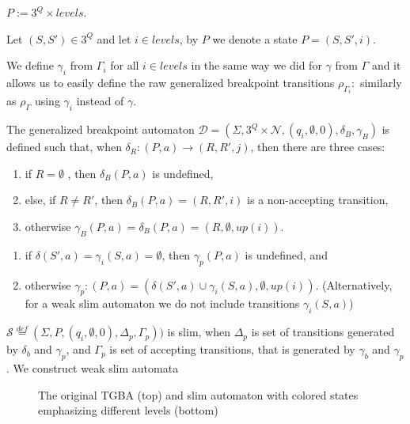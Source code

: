 \documentclass[
	digital
nolof, nolot
]{fithesis3}
\newcommand{\cD}{\mathcal{D}}
\newcommand{\cN}{\mathcal{N}}
\newcommand{\cS}{\mathcal{S}}
\newcommand{\eqdef}{\overset{def}{=}}
\begin{document}
			$P := 3^Q \times levels$.
			
			Let $(S,S')\in 3^Q$ and let $i \in levels$, by $P$ we denote a state $P=(S,S',i)$.
			
			We define $\gamma_i$ from $\Gamma_i$ for all $i \in levels$ in the same way we did for $\gamma$ from $\Gamma$ and it allows us to easily define the raw generalized breakpoint transitions
			$\rho_{\Gamma_{i}}\colon$ similarly as $\rho_\Gamma$ using $\gamma_i$ instead of $\gamma$.
			
			
			
			The generalized breakpoint automaton $\cD=(\Sigma, 3^Q\times\cN, ({q_i},\emptyset, 0),\delta_B,\gamma_B)$ is defined such that, when $\delta_R\colon(P, a) \rightarrow (R, R', j)$, then there are three cases:
			
			
			
			\begin{enumerate}
				\item if $R=\emptyset$ , then $\delta_B(P,a)$ is undefined,
				\item else, if $R \neq R'$, then $\delta_B(P,a) = (R,R',i)$ is a non-accepting transition,
				\item otherwise $\gamma_B(P, a) = \delta_B(P,a) = (R, \emptyset, up(i))$.
			\end{enumerate}
		
		
			\begin{enumerate}
				\item if $\delta(S',a)=\gamma_{i}(S, a)=\emptyset$, then $ \gamma_{p}(P,a)$ is undefined, and
				\item otherwise $\gamma_p \colon (P,a) = (\delta(S',a)\cup \gamma_{i}(S, a), \emptyset, up(i))$. (Alternatively, for a weak slim automaton we do not include transitions $\gamma_{i}(S, a)$)
			\end{enumerate}
			$\cS\eqdef(\Sigma, P, (q_i,\emptyset,0), \Delta_p,\Gamma_p))$ is slim, when $\Delta_p$ is set of transitions generated by $\delta_b$ and $\gamma_p$, and $\Gamma_p$ is set of accepting transitions, that is generated by $\gamma_b$ and $\gamma_p$. We construct weak slim automata 
			
						
			\begin{figure}[ht]
				\begin{center}
					
					
				\end{center}
				\caption{The original TGBA (top) and slim automaton with colored states emphasizing different levels (bottom)  }
				\label{fig:slim:gg}
			\end{figure}
			
\end{document}
